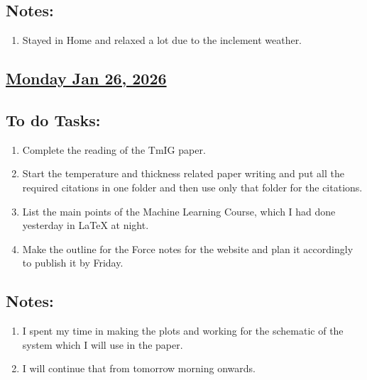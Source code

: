 \subsection*{Notes:}
\begin{enumerate}
    \item Stayed in Home and relaxed a lot due to the inclement weather.
\end{enumerate}
\subsection*{\underline{Monday Jan 26, 2026}}
\subsection*{To do Tasks:}
\begin{enumerate}
    \item Complete the reading of the TmIG paper. \cmark 
    \item Start the temperature and thickness related paper writing and put all the required citations in one folder and then use only that folder for the citations. \cmark 
    \item List the main points of the Machine Learning Course, which I had done yesterday in {\LaTeX} at night. \cmark
    \item Make the outline for the Force notes for the website and plan it accordingly to publish it by Friday. \xmark
\end{enumerate}
\subsection*{Notes:}
\begin{enumerate}
    \item I spent my time in making the plots and working for the schematic of the system which I will use in the paper.
    \item I will continue that from tomorrow morning onwards.
\end{enumerate}
